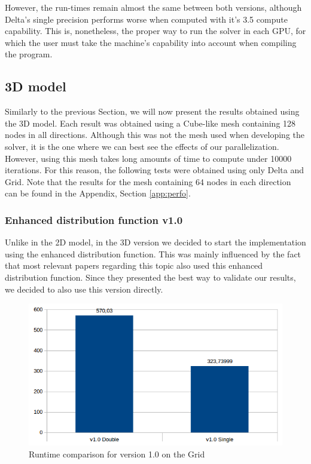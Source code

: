 \documentclass[12pt, openany]{book}
\begin{document}
  However, the run-times remain almost the same between both versions, although Delta's single precision performs worse when computed with it's 3.5 compute capability. This is, nonetheless, the proper way to run the solver in each GPU, for which the user must take the machine's capability into account when compiling the program.
 
\subsection{3D model}
Similarly to the previous Section, we will now present the results obtained using the 3D model. Each result was obtained using a Cube-like mesh containing 128 nodes in all directions. Although this was not the mesh used when developing the solver, it is the one where we can best see the effects of our parallelization. However, using this mesh takes long amounts of time to compute under 10000 iterations. For this reason, the following tests were obtained using only Delta and Grid. Note that the results for the mesh containing 64 nodes in each direction can be found in the Appendix, Section \ref{app:perfo}.
\subsubsection{Enhanced distribution function v1.0}
Unlike in the 2D model, in the 3D version we decided to start the implementation using the enhanced distribution function. This was mainly influenced by the fact that most relevant papers regarding this topic also used this enhanced distribution function. Since they presented the best way to validate our results, we decided to also use this version directly.

  \begin{figure}[H]
  	\centering
  	\includegraphics[width=\linewidth]{Resources/Images/v13d.png}
  	\caption{Runtime comparison for version 1.0 on the Grid}
  	\label{fig:v13d}
  \end{figure}
 
\end{document}

